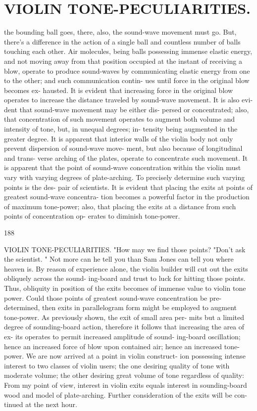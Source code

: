 \documentclass{article}
\begin{document}
\section*{VIOLIN TONE-PECULIARITIES.}
the bounding ball goes, there, also, the sound-wave movement must go. But, there's a difference in the action of a single ball and countless number of balls touching each other. Air molecules, being balls possessing immense elastic energy, and not moving away from that position occupied at the instant of receiving a blow, operate to produce sound-waves by communicating elastic energy from one to the other; and such communication contin- ues until force in the original blow becomes ex- hausted. It is evident that increasing force in the original blow operates to increase the distance traveled by sound-wave movement. It is also evi- dent that sound-wave movement may be either dis- persed or concentrated; also, that concentration of such movement operates to augment both volume and intensity of tone, but, in unequal degrees; in- tensity being augmented in the greater degree. It is apparent that interior walls of the violin body not only prevent dispersion of sound-wave move- ment, but also because of longitudinal and trans- verse arching of the plates, operate to concentrate such movement. It is apparent that the point of sound-wave concentration within the violin must vary with varying degrees of plate-arching. To precisely determine such varying points is the des- pair of scientists. It is evident that placing the exits at points of greatest sound-wave concentra- tion becomes a powerful factor in the production of maximum tone-power; also, that placing the exits at a distance from such points of concentration op- erates to diminish tone-power.

188

VIOLIN TONE-PECULIARITIES. "How may we find those points? "Don't ask the scientist. " Not more can he tell you than Sam Jones can tell you where heaven is. By reason of experience alone, the violin builder will cut out the exits obliquely across the sound- ing-board and trust to luck for hitting those points. Thus, obliquity in position of the exits becomes of immense value to violin tone power. Could those points of greatest sound-wave concentration be pre-determined, then exits in parallelogram form might be employed to augment tone-power. As previously shown, the exit of small area per- mits but a limited degree of sounding-board action, therefore it follows that increasing the area of ex- its operates to permit increased amplitude of sound- ing-board oscillation; hence an increased force of blow upon contained air; hence an increased tone- power. We are now arrived at a point in violin construct- ion possessing intense interest to two classes of violin users; the one desiring quality of tone with moderate volume; the other desiring great volume of tone regardless of quality: From my point of view, interest in violin exits equals interest in sounding-board wood and model of plate-arching. Further consideration of the exits will be con- tinued at the next hour.
\end{document}
